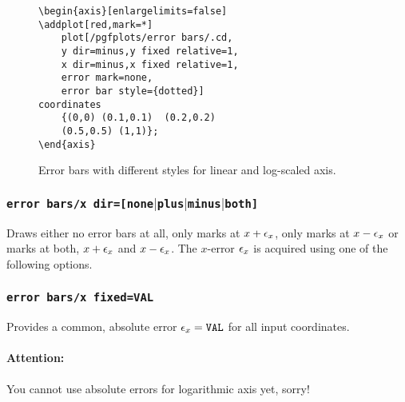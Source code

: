{\begin{figure}
	\nobreak
	\hspace{10pt}%
	\nobreak
	\begin{minipage}[t]{8cm}%
	\vspace{0pt}%
\begin{lstlisting}
\begin{axis}[enlargelimits=false]
\addplot[red,mark=*] 
	plot[/pgfplots/error bars/.cd,
	y dir=minus,y fixed relative=1,
	x dir=minus,x fixed relative=1,
	error mark=none,
	error bar style={dotted}]
coordinates
	{(0,0) (0.1,0.1)  (0.2,0.2) 	
	(0.5,0.5) (1,1)};
\end{axis}
\end{lstlisting}
	\end{minipage}%
	\caption{Error bars with different styles for linear and log-scaled axis.}
	\label{fig:errorbars}
\end{figure}

\subsubsection{\texttt{error bars/x dir=[none$|$plus$|$minus$|$both]}}
Draws either no error bars at all, only marks at $x+\epsilon_{x}$, only marks at $x-\epsilon_{x}$ or marks at both, $x+\epsilon_{x}$ and $x-\epsilon_{x}$. The $x$-error $\epsilon_{x}$ is acquired using one of the following options.

\subsubsection{\texttt{error bars/x fixed=VAL}}
Provides a common, absolute error $\epsilon_{x}=\text{\texttt{VAL}}$ for all input coordinates.

\paragraph{Attention:} You cannot use absolute errors for logarithmic axis yet, sorry!

}
